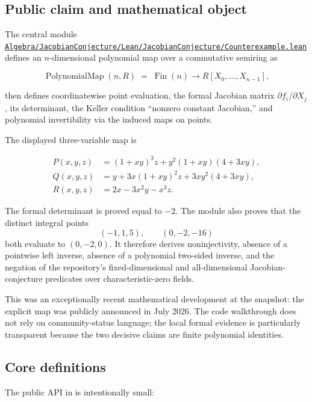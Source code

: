 \documentclass[
  10pt,
  a4paper,
  twoside,
  open=any,
  parskip=half,
  headings=big
]{scrreprt}
\newcommand{\CommitFull}{675d0a2ff0fc624fba199e006049016ba806f40a}
\newcommand{\RepoBlobBase}{https://github.com/VladimirReshetnikov/ProveIt/blob/\CommitFull/}
\newcommand{\RepoFile}[1]{%
  \href{\RepoBlobBase\detokenize{#1}}{\nolinkurl{#1}}}
\newcommand{\code}[1]{\texttt{\detokenize{#1}}}
\begin{document}
\subsection{Public claim and mathematical object}

The central module \RepoFile{Algebra/JacobianConjecture/Lean/JacobianConjecture/Counterexample.lean}
defines an \(n\)-dimensional polynomial map over a commutative semiring as

\[
  \operatorname{PolynomialMap}(n,R)
  \;=\; \operatorname{Fin}(n)\to R[X_0,\ldots,X_{n-1}],
\]

then defines coordinatewise point evaluation, the formal Jacobian matrix
\(\partial f_i/\partial X_j\), its determinant, the Keller condition
``nonzero constant Jacobian,'' and polynomial invertibility via the induced
maps on points.

The displayed three-variable map is

\[
\begin{aligned}
P(x,y,z) &= (1+xy)^3z+y^2(1+xy)(4+3xy),\\
Q(x,y,z) &= y+3x(1+xy)^2z+3xy^2(4+3xy),\\
R(x,y,z) &= 2x-3x^2y-x^3z.
\end{aligned}
\]

The formal determinant is proved equal to \(-2\).  The module also proves that
the distinct integral points
\[
  (-1,1,5),\qquad (0,-2,-16)
\]
both evaluate to \((0,-2,0)\).  It therefore derives noninjectivity, absence
of a pointwise left inverse, absence of a polynomial two-sided inverse, and
the negation of the repository's fixed-dimensional and all-dimensional
Jacobian-conjecture predicates over characteristic-zero fields.

This was an exceptionally recent mathematical development at the snapshot:
the explicit map was publicly announced in July 2026.  The code walkthrough
does not rely on community-status language; the local formal evidence is
particularly transparent because the two decisive claims are finite
polynomial identities.

\subsection{Core definitions}

The public API in \code{Counterexample.lean} is intentionally small:
\end{document}
